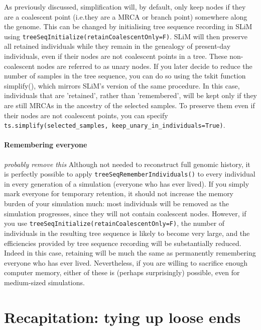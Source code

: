 \documentclass[12pt]{article}
\newcommand*{\ie}{i.e.\xcomma}
\newcommand{\comment}[1]{\textit{\color{green} #1}}
\begin{document}
As previously discussed, simplification will, by default, only keep nodes if they are a coalescent point
(\ie they are a MRCA or branch point) somewhere along the genome.
This can be changed by initialising tree sequence recording in SLiM using
\verb|treeSeqInitialize(retainCoalescentOnly=F)|.
SLiM will then preserve all retained individuals while they remain in the genealogy of present-day individuals,
even if their nodes are not coalescent points in a tree. These non-coalescent nodes are referred to as
unary nodes.
If you later decide to reduce the number
of samples in the tree sequence, you can do so using the tskit function simplify(),
which mirrors SLiM's version of the same procedure.
In this case, individuals that are 'retained', rather than 'remembered', will be kept only
if they are still MRCAs in the ancestry of the selected samples.
To preserve them even if their nodes are not coalescent points,
you can specify
\verb|ts.simplify(selected_samples, keep_unary_in_individuals=True)|.

\paragraph{Remembering everyone}
\comment{probably remove this}
Although not needed to reconstruct full genomic history,
it is perfectly possible to apply \verb|treeSeqRememberIndividuals()| to every individual
in every generation of a simulation (everyone who has ever lived).
If you simply mark everyone for temporary retention,
it should not increase the memory burden of your simulation much:
most individuals will be removed as the simulation progresses,
since they will not contain coalescent nodes.
However, if you use \verb|treeSeqInitialize(retainCoalescentOnly=F)|,
the number of individuals in the resulting tree sequence is likely to become very large,
and the efficiencies provided by tree sequence recording will be substantially reduced.
Indeed in this case,
retaining will be much the same as permanently remembering everyone who has ever lived.
Nevertheless, if you are willing to sacrifice enough computer memory,
either of these is (perhaps surprisingly) possible, even for medium-sized simulations.


\section{Recapitation: tying up loose ends}
\end{document}
